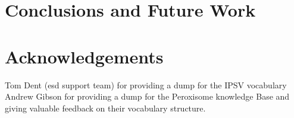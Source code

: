 \section{Conclusions and Future Work}\label{sec:conclusions}

\section{Acknowledgements}
Tom Dent (esd support team) for providing a dump for the IPSV vocabulary
Andrew Gibson for providing a dump for the Peroxisome knowledge Base and giving valuable feedback on their vocabulary structure.
